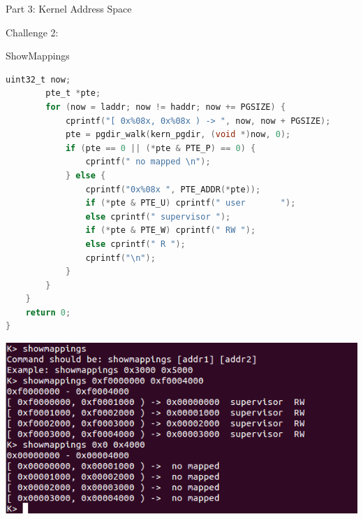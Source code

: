 \documentclass[GBK,winfonts,a4paper,10pt]{ctexart}
\begin{document}
\begin{section}{Part 3: Kernel Address Space}
\begin{subsection}{Challenge 2:}
\begin{subsubsection}{ ShowMappings }
\begin{lstlisting}[language=C]
        uint32_t now;
        pte_t *pte;
        for (now = laddr; now != haddr; now += PGSIZE) {
            cprintf("[ 0x%08x, 0x%08x ) -> ", now, now + PGSIZE); 
            pte = pgdir_walk(kern_pgdir, (void *)now, 0);
            if (pte == 0 || (*pte & PTE_P) == 0) {
                cprintf(" no mapped \n");
            } else {
                cprintf("0x%08x ", PTE_ADDR(*pte));
                if (*pte & PTE_U) cprintf(" user       ");
                else cprintf(" supervisor ");
                if (*pte & PTE_W) cprintf(" RW ");
                else cprintf(" R ");
                cprintf("\n");
            }
        }
    }
    return 0;
}
\end{lstlisting}
\includegraphics[scale=0.5]{showmappings.png}
\end{subsubsection}


\end{subsection}
\end{section}
\end{document}
